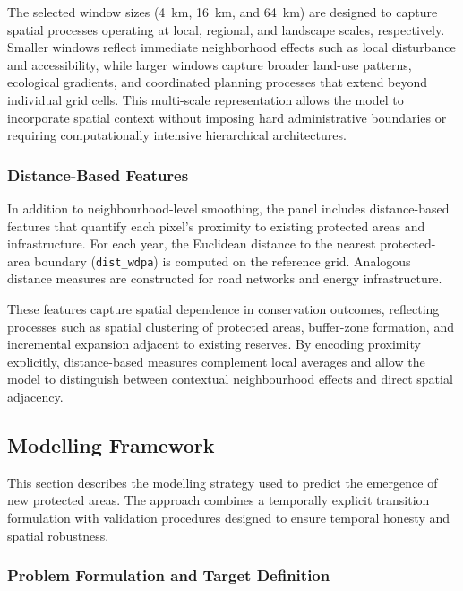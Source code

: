 \documentclass[12pt]{article}
\theoremstyle{break} %
\begin{document}
The selected window sizes (4~km, 16~km, and 64~km) are designed to capture spatial processes operating at local, regional, and landscape scales, respectively. Smaller windows reflect immediate neighborhood effects such as local disturbance and accessibility, while larger windows capture broader land-use patterns, ecological gradients, and coordinated planning processes that extend beyond individual grid cells. This multi-scale representation allows the model to incorporate spatial context without imposing hard administrative boundaries or requiring computationally intensive hierarchical architectures.

\subsubsection{Distance-Based Features}
\label{distance}

In addition to neighbourhood-level smoothing, the panel includes distance-based features that quantify each pixel’s proximity to existing protected areas and infrastructure. For each year, the Euclidean distance to the nearest protected-area boundary (\texttt{dist\_wdpa}) is computed on the reference grid. Analogous distance measures are constructed for road networks and energy infrastructure.

These features capture spatial dependence in conservation outcomes, reflecting processes such as spatial clustering of protected areas, buffer-zone formation, and incremental expansion adjacent to existing reserves. By encoding proximity explicitly, distance-based measures complement local averages and allow the model to distinguish between contextual neighbourhood effects and direct spatial adjacency.

\subsection{Modelling Framework}
\label{framework}

This section describes the modelling strategy used to predict the emergence of new protected areas. The approach combines a temporally explicit transition formulation with validation procedures designed to ensure temporal honesty and spatial robustness.

\subsubsection{Problem Formulation and Target Definition}
\label{problem-formulation}
\end{document}
